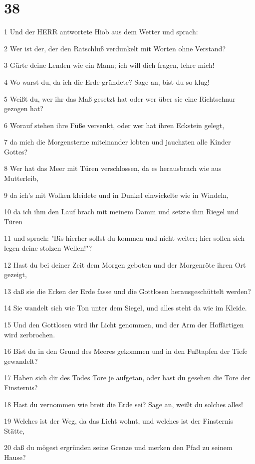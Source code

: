 \chapter{38}

\par 1 Und der HERR antwortete Hiob aus dem Wetter und sprach:
\par 2 Wer ist der, der den Ratschluß verdunkelt mit Worten ohne Verstand?
\par 3 Gürte deine Lenden wie ein Mann; ich will dich fragen, lehre mich!
\par 4 Wo warst du, da ich die Erde gründete? Sage an, bist du so klug!
\par 5 Weißt du, wer ihr das Maß gesetzt hat oder wer über sie eine Richtschnur gezogen hat?
\par 6 Worauf stehen ihre Füße versenkt, oder wer hat ihren Eckstein gelegt,
\par 7 da mich die Morgensterne miteinander lobten und jauchzten alle Kinder Gottes?
\par 8 Wer hat das Meer mit Türen verschlossen, da es herausbrach wie aus Mutterleib,
\par 9 da ich's mit Wolken kleidete und in Dunkel einwickelte wie in Windeln,
\par 10 da ich ihm den Lauf brach mit meinem Damm und setzte ihm Riegel und Türen
\par 11 und sprach: "Bis hierher sollst du kommen und nicht weiter; hier sollen sich legen deine stolzen Wellen!"?
\par 12 Hast du bei deiner Zeit dem Morgen geboten und der Morgenröte ihren Ort gezeigt,
\par 13 daß sie die Ecken der Erde fasse und die Gottlosen herausgeschüttelt werden?
\par 14 Sie wandelt sich wie Ton unter dem Siegel, und alles steht da wie im Kleide.
\par 15 Und den Gottlosen wird ihr Licht genommen, und der Arm der Hoffärtigen wird zerbrochen.
\par 16 Bist du in den Grund des Meeres gekommen und in den Fußtapfen der Tiefe gewandelt?
\par 17 Haben sich dir des Todes Tore je aufgetan, oder hast du gesehen die Tore der Finsternis?
\par 18 Hast du vernommen wie breit die Erde sei? Sage an, weißt du solches alles!
\par 19 Welches ist der Weg, da das Licht wohnt, und welches ist der Finsternis Stätte,
\par 20 daß du mögest ergründen seine Grenze und merken den Pfad zu seinem Hause?
